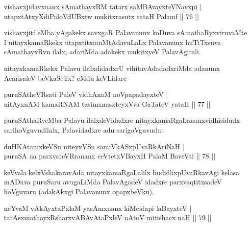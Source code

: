 \begin{shl}
vishavxjidavxnanx sAmathayxRM tatarx saMBAvayxteV\s Navxpi |\\
utapxtAtxyXdiPaloVdUBxtw mukitxrasutx tataH Palamf \hfill || 76 ||
\end{shl}

\begin{artha}
vishavxjitf eMba yAgakekx savxgaR Palavanunx koDuva sAmathaRyxviruvaMte I nitayxkamaRkekx utapxtitxmuMtAdavuLaLx Palavanunx huTiTxsuva sAmathayxRvu ilalx, adariMda adakekx mukitxyeV PalavAgirali.
\end{artha}

\begin{artha}
nitayxkamaRkekx Palavu ilalxdidadxrU vihitavAdadadxriMda adanunx AcarisaleV beVkaSeTx? eMdu keVLidare \mdash
\end{artha}

\begin{shl}
puruSAtheVR\s sati PaleV vidhAnaM noVpapadayxteV |\\
nitAyxnAM kamaRNAM tasimxnasxteyxVva GaTateV yataH \hfill || 77 ||
\end{shl}

\begin{artha}
puruSAthaRveMba Palavu ilalxdeVidadxre nitayxkamaRgaLanunx\break vidhisidudx sarihoVguvudilalx, Palavidadxre adu sarigoVguvudu.
\end{artha}


\begin{shl}
duHKAtamxkeVSu niteyxVSu samiVkASxpUvaRkAriNaH |\\
puruSA na parxvateVRrananx ceVtetxVBayxH PalaM BaveVtf \hfill || 78 ||
\end{shl}

\begin{artha}
keVvala kelxVshakaravAda  nitayxkamaRgaLalilx budidhxpUvaRkavAgi kelasa mADuva puruSaru avugaLiMda PalavAgadeV idadxre parxvaqtitxsadeV hoVguvaru (adakAkxgi Palavanunx opapxbeVku).
\end{artha}


\begin{shl}
neYvaM vAkAyxtaPxlaM yasAmxnanx kiMcidapi laBayxteV |\\
tatAsxmathayxRsharxvABAvAtaPxleV nAtoV mitishacx naH \hfill || 79 ||
\end{shl}

